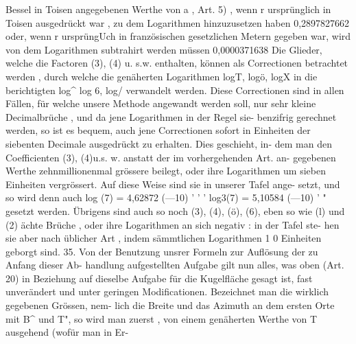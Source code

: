 \documentclass[12pt,a4paper]{article}
\begin{document}
Bessel  in  Toisen  angegebenen  Werthe  von  a ,  Art.  5) ,  wenn  r  ursprünglich  in Toisen  ausgedrückt  war ,  zu  dem  Logarithmen  hinzuzusetzen  haben 0,2897827662 oder,  wenn  r  ursprüngUch  in  französischen  gesetzlichen  Metern  gegeben  war, wird  von  dem  Logarithmen  subtrahirt  werden  müssen 0,0000371638 Die  Glieder,  welche  die  Factoren  (3),  (4)  u.  s.w.  enthalten,  können  als Correctionen  betrachtet  werden ,  durch  welche  die  genäherten  Logarithmen logT,  logö,  logX  in  die  berichtigten  log\^{}  log 6,  log/  verwandelt  werden.  Diese Correctionen  sind  in  allen  Fällen,  für  welche  unsere  Methode  angewandt  werden soll,  nur  sehr  kleine  Decimalbrüche ,  und  da  jene  Logarithmen  in  der  Regel  sie- benzifrig  gerechnet  werden,  so  ist  es  bequem,  auch  jene  Correctionen  sofort  in Einheiten  der  siebenten  Decimale  ausgedrückt  zu  erhalten.  Dies  geschieht,  in- dem man  den  Coefficienten  (3),  (4)u.s.  w.  anstatt  der  im  vorhergehenden  Art.  an- gegebenen Werthe  zehnmillionenmal  grössere  beilegt,  oder  ihre  Logarithmen  um sieben  Einheiten  vergrössert.  Auf  diese  Weise  sind  sie  in  unserer  Tafel  ange- setzt, und  so  wird  denn  auch log    (7)  =  4,62872   (---10)  '  '  ' log3(7)  =  5,10584    (---10)  ' " gesetzt  werden.  Übrigens  sind  auch  so  noch  (3),  (4),  (ö),  (6),  eben  so  wie  (l) und  (2)  ächte  Brüche ,  oder  ihre  Logarithmen  an  sich  negativ :  in  der  Tafel  ste- hen sie  aber  nach  üblicher  Art ,  indem  sämmtlichen  Logarithmen  1 0  Einheiten geborgt  sind. 35. Von  der  Benutzung  unsrer  Formeln  zur  Auflösung  der  zu  Anfang  dieser  Ab- handlung aufgestellten  Aufgabe  gilt  nun  alles,  was  oben  (Art.  20)  in  Beziehung auf  dieselbe  Aufgabe  für  die  Kugelfläche  gesagt  ist,  fast  unverändert  und  unter geringen  Modificationen.  Bezeichnet  man  die  wirklich  gegebenen  Grössen,  nem- lich  die  Breite  und  das  Azimuth  an  dem  ersten  Orte  mit  B\^{}  und  T",  so  wird man  zuerst ,   von  einem  genäherten  Werthe  von    T  ausgehend  (wofür  man  in  Er-
\end{document}

